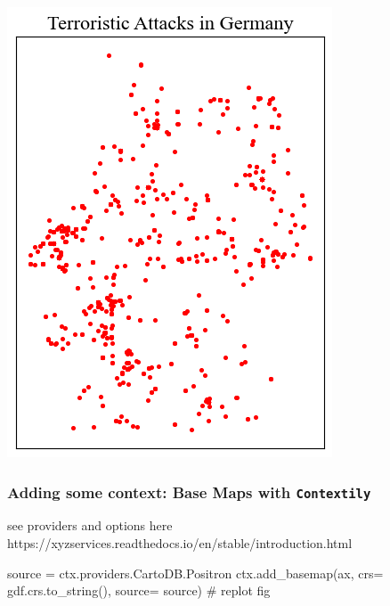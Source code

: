 \documentclass[
  letterpaper,
  DIV=11,
  numbers=noendperiod]{scrreprt}
\newenvironment{Shaded}{\begin{snugshade}}{\end{snugshade}}
\newcommand{\CommentTok}[1]{\textcolor[rgb]{0.37,0.37,0.37}{#1}}
\newcommand{\NormalTok}[1]{\textcolor[rgb]{0.00,0.23,0.31}{#1}}
\newcommand{\OperatorTok}[1]{\textcolor[rgb]{0.37,0.37,0.37}{#1}}
\begin{document}
\includegraphics{labs/w02_maps_files/figure-pdf/cell-6-output-1.png}

\subsubsection{\texorpdfstring{Adding some context: Base Maps with
\texttt{Contextily}}{Adding some context: Base Maps with Contextily}}\label{adding-some-context-base-maps-with-contextily}

see providers and options here
https://xyzservices.readthedocs.io/en/stable/introduction.html

\begin{Shaded}
\begin{Highlighting}[]
\NormalTok{source }\OperatorTok{=}\NormalTok{ ctx.providers.CartoDB.Positron}
\NormalTok{ctx.add\_basemap(ax, crs}\OperatorTok{=}\NormalTok{ gdf.crs.to\_string(), source}\OperatorTok{=}\NormalTok{ source)}
\CommentTok{\# replot}
\NormalTok{fig}
\end{Highlighting}
\end{Shaded}
\end{document}
